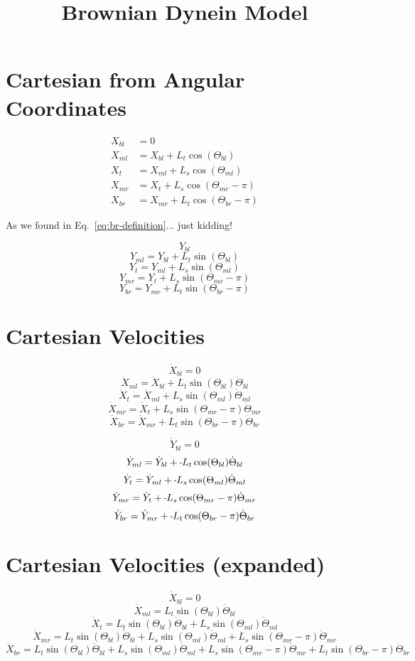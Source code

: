 \documentclass[11pt, landscape]{article}
\title{Brownian Dynein Model}
\newcommand{\mn}{\scalebox{0.7}[1.0]{-}}
\begin{document}
\maketitle

\section{Cartesian from Angular Coordinates}
\begin{align}
  X_{bl} &= 0 \\
  X_{ml} &= X_{bl}+L_{t}\cos(\Theta_{bl}) \\
  X_{t}  &= X_{ml}+L_{s}\cos(\Theta_{ml}) \\
  X_{mr} &= X_{t} +L_{s}\cos(\Theta_{mr}-\pi) \\
  X_{br} &= X_{mr}+L_{t}\cos(\Theta_{br}-\pi) \label{eq:br-definition}
\end{align}

As we found in Eq.~\ref{eq:br-definition}... just kidding!

$$Y_{bl}$$
$$Y_{ml} = Y_{bl}+L_{t}\sin(\Theta_{bl})$$
$$Y_{t}  = Y_{ml}+L_{s}\sin(\Theta_{ml})$$
$$Y_{mr} = Y_{t} +L_{s}\sin(\Theta_{mr}-\pi)$$
$$Y_{br} = Y_{mr}+L_{t}\sin(\Theta_{br}-\pi)$$

\section{Cartesian Velocities}
$$\dot{X}_{bl} = 0$$
$$\dot{X}_{ml} = \dot{X}_{bl} + L_{t}\sin(\Theta_{bl})      \dot{\Theta}_{bl}$$
$$\dot{X}_{t } = \dot{X}_{ml} + L_{s}\sin(\Theta_{ml})      \dot{\Theta}_{ml}$$
$$\dot{X}_{mr} = \dot{X}_{t } + L_{s}\sin(\Theta_{mr}-\pi)  \dot{\Theta}_{mr}$$
$$\dot{X}_{br} = \dot{X}_{mr} + L_{t}\sin(\Theta_{br}-\pi)  \dot{\Theta}_{br}$$
                                                                               
$$\dot{Y}_{bl} = 0$$                                                               
$$\dot{Y}_{ml} = \dot{Y}_{bl} + \mn L_{t}\cos(\Theta_{bl})      \dot{\Theta}_{bl}$$
$$\dot{Y}_{t}  = \dot{Y}_{ml} + \mn L_{s}\cos(\Theta_{ml})      \dot{\Theta}_{ml}$$
$$\dot{Y}_{mr} = \dot{Y}_{t } + \mn L_{s}\cos(\Theta_{mr}-\pi)  \dot{\Theta}_{mr}$$
$$\dot{Y}_{br} = \dot{Y}_{mr} + \mn L_{t}\cos(\Theta_{br}-\pi)  \dot{\Theta}_{br}$$

\section{Cartesian Velocities (expanded)}
$$\dot{X}_{bl} = 0$$
$$\dot{X}_{ml} = L_{t}\sin(\Theta_{bl})  \dot{\Theta}_{bl}$$
$$\dot{X}_{t } = L_{t}\sin(\Theta_{bl})  \dot{\Theta}_{bl} + L_{s}\sin(\Theta_{ml})      \dot{\Theta}_{ml}$$
$$\dot{X}_{mr} = L_{t}\sin(\Theta_{bl})  \dot{\Theta}_{bl} + L_{s}\sin(\Theta_{ml})      \dot{\Theta}_{ml} + L_{s}\sin(\Theta_{mr}-\pi)  \dot{\Theta}_{mr}$$
$$\dot{X}_{br} = L_{t}\sin(\Theta_{bl})  \dot{\Theta}_{bl} + L_{s}\sin(\Theta_{ml})      \dot{\Theta}_{ml} + L_{s}\sin(\Theta_{mr}-\pi)  \dot{\Theta}_{mr} + L_{t}\sin(\Theta_{br}-\pi)  \dot{\Theta}_{br}$$
                                                                               
\end{document}
